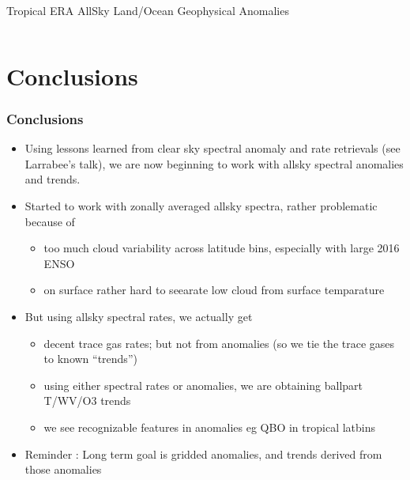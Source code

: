 \documentclass[10pt,t]{beamer}
\begin{document}
\begin{frame}{Tropical ERA AllSky Land/Ocean Geophysical Anomalies}
\begin{columns}
\begin{column}{0.45\columnwidth}

\end{column}
\end{columns}
\end{frame}


\section{Conclusions}
\begin{frame}
  \frametitle{Conclusions}
  \begin{itemize}
  \item Using lessons learned from clear sky spectral anomaly and rate retrievals (see Larrabee's talk), 
        we are now beginning to work with  allsky spectral anomalies and trends.
  \item Started to work with zonally averaged allsky spectra, rather problematic because of
  \begin{itemize}
    \item too much cloud variability across latitude bins, especially with large 2016 ENSO
    \item on surface rather hard to seearate low cloud from surface temparature
  \end{itemize}
  \item But using allsky spectral rates, we actually get 
  \begin{itemize}
    \item  decent trace gas rates; but not from anomalies (so we tie the trace gases to known ``trends'')
    \item using either spectral rates or anomalies, we are obtaining ballpart T/WV/O3 trends
    \item we see recognizable features in anomalies eg QBO in tropical latbins
  \end{itemize}
  \item Reminder : Long term goal is gridded anomalies, and trends derived from those anomalies
  \end{itemize}
\end{frame}
\end{document}
